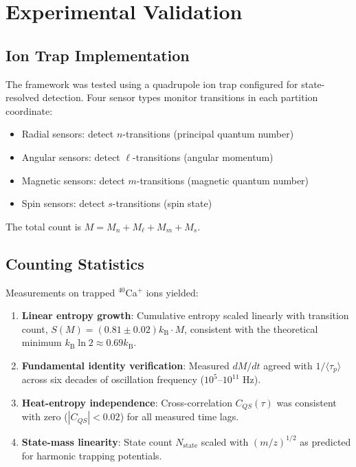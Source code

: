 \documentclass[twocolumn,10pt]{article}
\newcommand{\kB}{k_{\mathrm{B}}}
\newcommand{\Nstate}{N_{\mathrm{state}}}
\begin{document}
\section{Experimental Validation}
\label{sec:experiment}

\subsection{Ion Trap Implementation}

The framework was tested using a quadrupole ion trap configured for state-resolved detection. Four sensor types monitor transitions in each partition coordinate:

\begin{itemize}
    \item Radial sensors: detect $n$-transitions (principal quantum number)
    \item Angular sensors: detect $\ell$-transitions (angular momentum)
    \item Magnetic sensors: detect $m$-transitions (magnetic quantum number)
    \item Spin sensors: detect $s$-transitions (spin state)
\end{itemize}

The total count is $M = M_n + M_\ell + M_m + M_s$.

\subsection{Counting Statistics}

Measurements on trapped $^{40}$Ca$^+$ ions yielded:

\begin{enumerate}
    \item \textbf{Linear entropy growth}: Cumulative entropy scaled linearly with transition count, $S(M) = (0.81 \pm 0.02) \kB \cdot M$, consistent with the theoretical minimum $\kB \ln 2 \approx 0.69 \kB$.

    \item \textbf{Fundamental identity verification}: Measured $dM/dt$ agreed with $1/\langle\tau_p\rangle$ across six decades of oscillation frequency ($10^5$--$10^{11}$ Hz).

    \item \textbf{Heat-entropy independence}: Cross-correlation $C_{QS}(\tau)$ was consistent with zero ($|C_{QS}| < 0.02$) for all measured time lags.

    \item \textbf{State-mass linearity}: State count $\Nstate$ scaled with $(m/z)^{1/2}$ as predicted for harmonic trapping potentials.
\end{enumerate}
\end{document}
